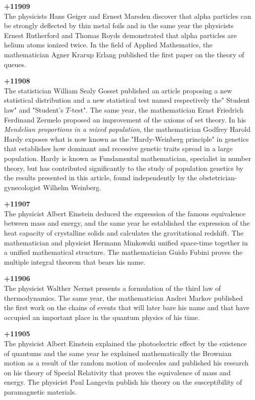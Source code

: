 \textbf{+11909}\\
The physicists Hans Geiger and Ernest Marsden discover that alpha particles can be strongly deflected by thin metal foils and in the same year the physicists Ernest Rutherford and Thomas Royds demonstrated that alpha particles are helium atoms ionized twice. In the field of Applied Mathematics, the mathematician Agner Krarup Erlang published the first paper on the theory of queues. 

\textbf{+11908}\\
The statistician William Sealy Gosset published an article proposing a new statistical distribution and a new statistical test named respectively the" Student law" and "Student's $T$-test". The same year, the mathematician Ernst Friedrich Ferdinand Zermelo proposed an improvement of the axioms of set theory. In his \textit{Mendelian proportions in a mixed population}, the mathematician Godfrey Harold Hardy exposes what is now known as the "Hardy-Weinberg principle" in genetics that establishes how dominant and recessive genetic traits spread in a large population. Hardy is known as Fundamental mathematician, specialist in number theory, but has contributed significantly to the study of population genetics by the results presented in this article, found independently by the obstetrician-gynecologist Wilhelm Weinberg.

\textbf{+11907}\\
The physicist Albert Einstein deduced the expression of the famous equivalence between mass and energy, and the same year he established the expression of the heat capacity of crystalline solids and calculates the gravitational redshift. The mathematician and physicist Hermann Minkowski unified space-time together in a unified mathematical structure. The mathematician Guido Fubini proves the multiple integral theorem that bears his name.

\textbf{+11906}\\
The physicist Walther Nernst presents a formulation of the third law of thermodynamics. The same year, the mathematician Andrei Markov published the first work on the chains of events that will later bare his name and that have occupied an important place in the quantum physics of his time. 

\textbf{+11905}\\
The physicist Albert Einstein explained the photoelectric effect by the existence of quantums and the same year he explained mathematically the Brownian motion as a result of the random motion of molecules and published his research on his theory of Special Relativity that proves the equivalence of mass and energy. The physicist Paul Langevin publish his theory on the susceptibility of paramagnetic materials.

